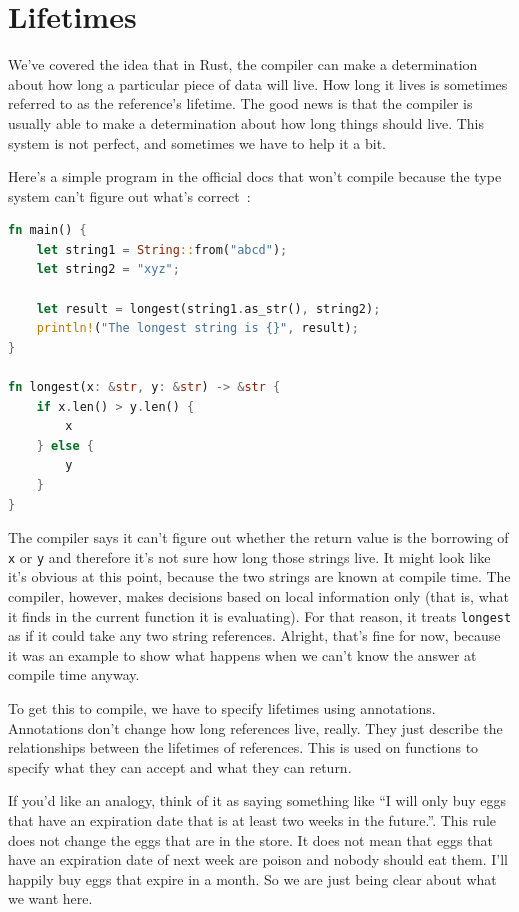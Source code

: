 \documentclass[a4paper]{report}
\begin{document}
\section*{Lifetimes}
We've covered the idea that in Rust, the compiler can make a determination about how long a particular piece of data will live. How long it lives is sometimes referred to as the reference's lifetime. The good news is that the compiler is usually able to make a determination about how long things should live. This system is not perfect, and sometimes we have to help it a bit.

Here's a simple program in the official docs that won't compile because the type system can't figure out what's correct~\cite{rustdocs}:

\begin{lstlisting}[language=Rust]
fn main() {
    let string1 = String::from("abcd");
    let string2 = "xyz";

    let result = longest(string1.as_str(), string2);
    println!("The longest string is {}", result);
}

fn longest(x: &str, y: &str) -> &str {
    if x.len() > y.len() {
        x
    } else {
        y
    }
}
\end{lstlisting}

The compiler says it can't figure out whether the return value is the borrowing of \texttt{x} or \texttt{y} and therefore it's not sure how long those strings live. It might look like it's obvious at this point, because the two strings are known at compile time. The compiler, however, makes decisions based on local information only (that is, what it finds in the current function it is evaluating). For that reason, it treats \texttt{longest} as if it could take any two string references. Alright, that's fine for now, because it was an example to show what happens when we can't know the answer at compile time anyway.

To get this to compile, we have to specify lifetimes using annotations. Annotations don't change how long references live, really. They just describe the relationships between the lifetimes of references. This is used on functions to specify what they can accept and what they can return.

If you'd like an analogy, think of it as saying something like ``I will only buy eggs that have an expiration date that is at least two weeks in the future.''. This rule does not change the eggs that are in the store. It does not mean that eggs that have an expiration date of next week are poison and nobody should eat them. I'll happily buy eggs that expire in a month. So we are just being clear about what we want here.
\end{document}
